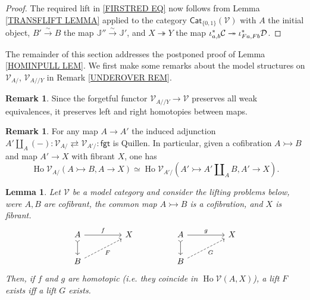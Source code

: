 \documentclass[a4paper,10pt
,draft
]{article}%
\numberwithin{equation}{section}
\numberwithin{figure}{section}
\newtheorem{lemma}[equation]{Lemma}%
\theoremstyle{definition} %
\newtheorem{remark}[equation]{Remark}%
\DeclareMathOperator{\Ho}{Ho}
\newcommand{\V}{\ensuremath{\mathcal V}}
\newcommand{\1}{\ensuremath{\mathbbm 1}}%
\begin{document}
\begin{proof}
	The required lift in \eqref{FIRSTRED EQ} now follows from 
	Lemma \ref{TRANSFLIFT LEMMA}
	applied to the category
	$\mathsf{Cat}_{\{0,1\}}(\V)$
	with $A$ the initial object,
	$B' \xrightarrow{\sim} B$ the map
	$\mathbb{J}'' \xrightarrow{\sim} \mathbb{J}'$,
	and $X \twoheadrightarrow Y$
	the map 
	$\iota^{\**}_{a,b} \mathcal{C}
	\twoheadrightarrow
	\iota^{\**}_{Fa,Fb} \mathcal{D}$.
\end{proof}



The remainder of this section addresses the postponed proof of
Lemma \ref{HOMINPULL LEM}.
We first make some remarks about 
the model structures
on $\V_{A/}$, $\V_{A//Y}$ in Remark \ref{UNDEROVER REM}.



\begin{remark}\label{UNDFGT REM}
	Since the forgetful functor $\V_{A//Y} \to \V$
	preserves all weak equivalences, 
	it preserves left and right homotopies \cite[\S 4.1,\S 4.12]{DS95} between maps.
\end{remark}


\begin{remark} \label{LEFTQUILUND REM}
	For any map $A \to A'$ the induced adjunction
	$A' \amalg_A (-) \colon \V_{A/} 
	\rightleftarrows 
	\V_{A'/} \colon \mathsf{fgt}$
	is Quillen.
	In particular,
	given a cofibration 
	$A \rightarrowtail B$
	and map $A' \to X$ with fibrant $X$, one has
	\[
	\Ho \V_{A/}\left(A \rightarrowtail B, A \to X\right)
	\simeq
	\Ho \V_{A'/}\left(A' \rightarrowtail A' \amalg_A B, A' \to X\right).
	\]
\end{remark}



\begin{lemma}\label{LIFTEQUIV LEM}
	Let $\V$ be a model category and
	consider the lifting problems below, were $A,B$ are cofibrant, 
	the common map $A \rightarrowtail B$ is a cofibration, and $X$ is fibrant.
	\begin{equation}
	\begin{tikzcd}[column sep = 45pt]
	A
	\ar[rightarrowtail]{d}
	\arrow{r}{f}
	&
	X
	&%
	A
	\ar[rightarrowtail]{d}
	\arrow{r}{g}
	&
	X
	\\
	B \ar[dashed]{ru}[swap]{F}
	&
	&%
	B \ar[dashed]{ru}[swap]{G}
	&
	\end{tikzcd}
	\end{equation}
	Then, if $f$ and $g$ are homotopic 
	(i.e. they coincide in $\Ho \V(A,X)$),
	a lift $F$ exists iff a lift $G$ exists.
\end{lemma}
\end{document}
